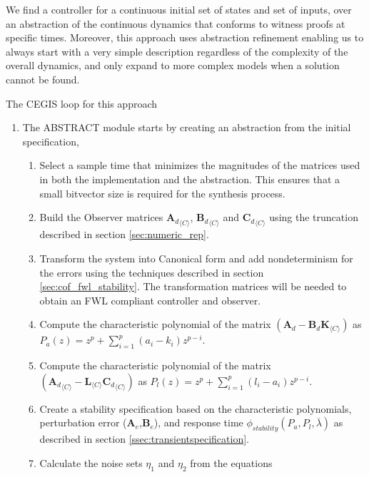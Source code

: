 \documentclass[sigconf]{llncs}
\newcommand{\mat}[1]{\boldsymbol{#1}}
\begin{document}

We find a controller for a continuous initial set of states and set of inputs,
over an abstraction of the continuous dynamics \cite{cattaruzza2015unbounded}
that conforms to witness proofs at specific times.
Moreover, this approach uses abstraction refinement enabling us to always
start with a very simple description regardless of the complexity of the
overall dynamics, and only expand to more complex models when a solution
cannot be found.

The CEGIS loop for this approach 

\begin{enumerate}
\item 
The {\sc ABSTRACT} module starts by creating an abstraction from the initial specification,
\begin{enumerate}
\item Select a sample time that minimizes the magnitudes of the matrices used in both the
implementation and the abstraction. This ensures that a small bitvector size is required for
the synthesis process.
\item Build the Observer matrices ${\mat{A}_d}_{\langle C \rangle}$, ${\mat{B}_d}_{\langle C \rangle}$
and ${\mat{C}_d}_{\langle C \rangle}$ using the truncation described in section \ref{sec:numeric_rep}.
\item Transform the system into Canonical form and add nondeterminism for the errors
using the techniques described in section \ref{sec:cof_fwl_stability}. The transformation
matrices will be needed to obtain an FWL compliant controller and observer.
\item Compute the characteristic polynomial of the matrix $(\mat{A}_d-\mat{B}_d\mat{K}_{\langle C \rangle})$
as $P_a(z) = z^p+\sum_{i=1}^p{(a_i-k_i)z^{p-i}}$. 
\item Compute the characteristic polynomial of the matrix $({\mat{A}_d}_{\langle C \rangle}-\mat{L}_{\langle C \rangle}{\mat{C}_d}_{\langle C \rangle})$
as $P_l(z) = z^p+\sum_{i=1}^p{(l_i-a_i)z^{p-i}}$. 
\item Create a stability specification based on the characteristic polynomials, perturbation
error ($\mat{A}_e$,$\mat{B}_e$), and response time $\phi_{stability}(P_a,P_l,\overline{\lambda})$
as described in section \ref{ssec:transientspecification}.
\item Calculate the noise sets $\eta_1$ and $\eta_2$ from the equations

\end{enumerate}
\end{enumerate}
\end{document}
